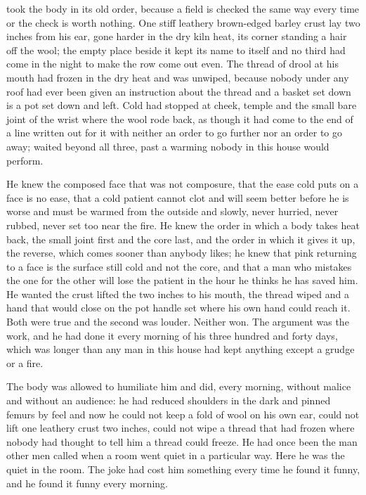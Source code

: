  took the body in its old order, because a field is checked the same way every time or the check is worth nothing. One stiff leathery brown-edged barley crust lay two inches from his ear, gone harder in the dry kiln heat, its corner standing a hair off the wool; the empty place beside it kept its name to itself and no third had come in the night to make the row come out even. The thread of drool at his mouth had frozen in the dry heat and was unwiped, because nobody under any roof had ever been given an instruction about the thread and a basket set down is a pot set down and left. Cold had stopped at cheek, temple and the small bare joint of the wrist where the wool rode back, as though it had come to the end of a line written out for it with neither an order to go further nor an order to go away;  waited beyond all three, past a warming nobody in this house would perform.

He knew the composed face that was not composure, that the ease cold puts on a face is no ease, that a cold patient cannot clot and will seem better before he is worse and must be warmed from the outside and slowly, never hurried, never rubbed, never set too near the fire. He knew the order in which a body takes heat back, the small joint first and the core last, and the order in which it gives it up, the reverse, which comes sooner than anybody likes; he knew that pink returning to a face is the surface still cold and not the core, and that a man who mistakes the one for the other will lose the patient in the hour he thinks he has saved him. He wanted the crust lifted the two inches to his mouth, the thread wiped and a hand that would close on the pot handle set where his own hand could reach it. Both were true and the second was louder. Neither won. The argument was the work, and he had done it every morning of his three hundred and forty days, which was longer than any man in this house had kept anything except a grudge or a fire.

The body was allowed to humiliate him and did, every morning, without malice and without an audience: he had reduced shoulders in the dark and pinned femurs by feel and now he could not keep a fold of wool on his own ear, could not lift one leathery crust two inches, could not wipe a thread that had frozen where nobody had thought to tell him a thread could freeze. He had once been the man other men called when a room went quiet in a particular way. Here he was the quiet in the room. The joke had cost him something every time he found it funny, and he found it funny every morning.

